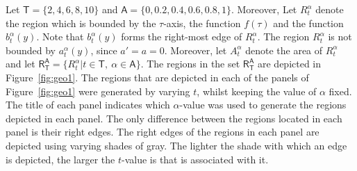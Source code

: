 \documentclass[twoside,reqno,11pt]{fcaa-var} %
\begin{document}


\noindent
Let $\mathsf{T}=\{2,4,6,8,10\}$ and $\mathsf{A} = \{0,0.2,0.4,0.6,0.8,1\}$. Moreover, Let $R_{t}^{\alpha}$ denote the region which is bounded by the $\tau$-axis, the function $f(\tau)$ and the function $b_{t}^{\alpha}(y)$. Note that $b_{t}^{\alpha}(y)$ forms the 
right-most edge of $R_{t}^{\alpha}$. The region $R_{t}^{\alpha}$ is not bounded by $a_{t}^{\alpha}(y)$, since $a'=a=0$. Moreover, let $A_{t}^{\alpha}$ denote the area of $R_{t}^{\alpha}$ and let $\mathsf{R}_{\mathsf{T}}^{\mathsf{A}}=\{R_t^{\alpha}|t\in\mathsf{T},~\alpha\in\mathsf{A}\}$. The regions in the set $\mathsf{R}_{\mathsf{T}}^{\mathsf{A}}$ are depicted in Figure~\ref{fig:geo1}. The regions that are depicted in each of the panels of Figure~\ref{fig:geo1} were generated by varying $t$, whilst keeping the value of $\alpha$ fixed. The title of each panel indicates which $\alpha$-value was used to generate the regions depicted in each panel. The only difference between the regions located in each panel is their right edges. The right edges of the regions in each panel are depicted using varying shades of gray. The lighter the shade with which an edge is depicted, the larger the $t$-value is that is associated with it.\\
\end{document}
